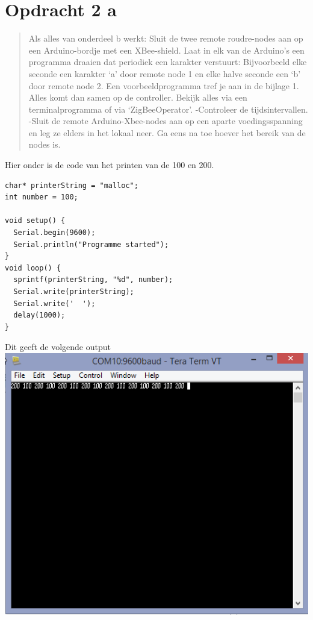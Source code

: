 \documentclass[12pt]{article}
\begin{document}
\section*{Opdracht 2 a}
\begin{quote}
Als alles van onderdeel b werkt: Sluit de twee remote roudre-nodes aan op een Arduino-bordje met een XBee-shield. Laat in elk van de Arduino’s een programma draaien dat periodiek een karakter verstuurt: Bijvoorbeeld elke seconde een karakter ‘a’ door remote node 1 en elke halve seconde een ‘b’ door remote node 2. Een voorbeeldprogramma tref je aan in de bijlage 1. Alles komt dan samen op de controller. Bekijk alles via een terminalprogramma of via ‘ZigBeeOperator’. -Controleer de tijdsintervallen. -Sluit de remote Arduino-Xbee-nodes aan op een aparte voedingsspanning en leg ze elders in het lokaal neer. Ga eens na toe hoever het bereik van de nodes is.
\end{quote}
Hier onder is de code van het printen van de 100 en 200.
\begin{lstlisting}
char* printerString = "malloc";
int number = 100;
  
void setup() {
  Serial.begin(9600);
  Serial.println("Programme started");
}
void loop() {
  sprintf(printerString, "%d", number);
  Serial.write(printerString);
  Serial.write('  ');
  delay(1000);
}
\end{lstlisting}
Dit geeft de volgende output
\\
\includegraphics[scale=1] {foto1}
\newpage
\end{document}
